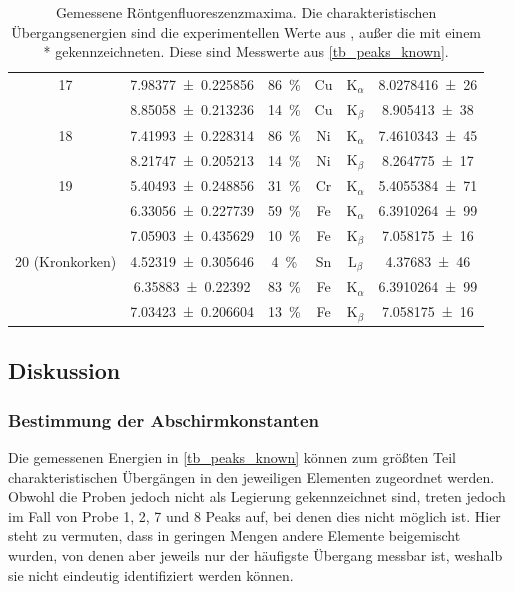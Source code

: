 \documentclass[
	a4paper,
	12pt,
	pagesize,
	ngerman
]{scrartcl}
\begin{document}
\begin{table}[H]
{\begin{tabular}{ c | c | c || c | c | c }
			17 
			& \SI{7.98377+-0.225856}{} &\SI{86}{\%}& Cu & $\text{K}_\alpha$ & \SI{8,0278416(26)}{} \\
			& \SI{8.85058+-0.213236}{} &\SI{14}{\%}& Cu & $\text{K}_\beta$ & \SI{8,905413(38)}{} \\ 
			\hline
			
			18 
			& \SI{7.41993+-0.228314}{} &\SI{86}{\%}& Ni & $\text{K}_\alpha$ & \SI{7,4610343(45)}{} \\
			& \SI{8.21747+-0.205213}{} &\SI{14}{\%}& Ni & $\text{K}_\beta$ &   \SI{8,264775(17)}{} \\ 
			\hline
			
			19 
			& \SI{5.40493+-0.248856}{} &\SI{31}{\%}& Cr & $\text{K}_\alpha$ & \SI{5,4055384(71)}{} \\
			& \SI{6.33056+-0.227739}{} &\SI{59}{\%}& Fe & $\text{K}_\alpha$ & \SI{ 6,3910264(99)}{} \\
			& \SI{7.05903+-0.435629}{} &\SI{10}{\%}& Fe &  $\text{K}_\beta $ & \SI{7,058175(16)}{} \\ 
			\hline
			
			20 (Kronkorken) 
			& \SI{4.52319+-0.305646}{} &\SI{4}{\%}& Sn & $\text{L}_\beta $ &  \SI{4,37683(46)}{} \\ %
			& \SI{6.35883+-0.22392}{} &\SI{83}{\%}& Fe & $\text{K}_\alpha $ &  \SI{6,3910264(99)}{} \\
			& \SI{7.03423+-0.206604}{} &\SI{13}{\%}& Fe & $\text{K}_\beta $ &  \SI{7,058175(16)}{} \\ 
			\hline
		\end{tabular}
		}
		\caption{Gemessene Röntgenfluoreszenzmaxima. Die charakteristischen Übergangsenergien sind die experimentellen Werte aus \cite{XRAYDB}, außer die mit einem * gekennzeichneten. Diese sind Messwerte aus \cref{tb_peaks_known}.} %
		\label{tb_peaks_unknown}
		
	\end{table}
	
	\subsection{Diskussion}
	\subsubsection{Bestimmung der Abschirmkonstanten}
	Die gemessenen Energien in \cref{tb_peaks_known} können zum größten Teil charakteristischen Übergängen in den jeweiligen Elementen zugeordnet werden.
	Obwohl die Proben jedoch nicht als Legierung gekennzeichnet sind, treten jedoch im Fall von Probe 1, 2, 7 und 8 Peaks auf, bei denen dies nicht möglich ist.
	Hier steht zu vermuten, dass in geringen Mengen andere Elemente beigemischt wurden, von denen aber jeweils nur der häufigste Übergang messbar ist, weshalb sie nicht eindeutig identifiziert werden können.
	
\end{document}
